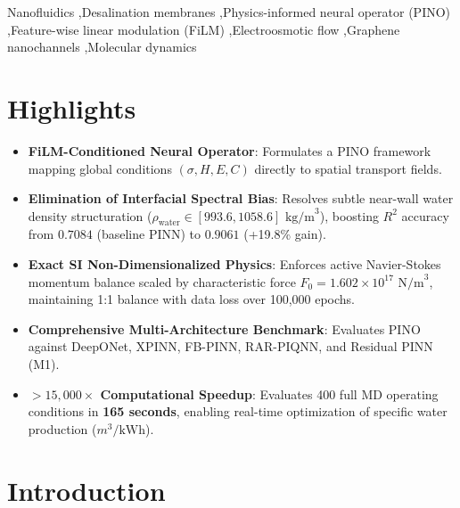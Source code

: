 \documentclass[3p,preprint,12pt,numbers,square,sort&compress]{elsarticle}
\begin{document}
\begin{frontmatter}
\begin{keyword}
Nanofluidics \sep Desalination membranes \sep Physics-informed neural operator (PINO) \sep Feature-wise linear modulation (FiLM) \sep Electroosmotic flow \sep Graphene nanochannels \sep Molecular dynamics
\end{keyword}

\end{frontmatter}

\section*{Highlights}
\begin{itemize}
    \item \textbf{FiLM-Conditioned Neural Operator}: Formulates a PINO framework mapping global conditions $(\sigma, H, E, C)$ directly to spatial transport fields.
    \item \textbf{Elimination of Interfacial Spectral Bias}: Resolves subtle near-wall water density structuration ($\rho_{\text{water}} \in [993.6, 1058.6]\text{ kg/m}^3$), boosting $R^2$ accuracy from $0.7084$ (baseline PINN) to \textbf{$0.9061$} (+19.8\% gain).
    \item \textbf{Exact SI Non-Dimensionalized Physics}: Enforces active Navier-Stokes momentum balance scaled by characteristic force $F_0 = 1.602 \times 10^{17}\text{ N/m}^3$, maintaining 1:1 balance with data loss over 100,000 epochs.
    \item \textbf{Comprehensive Multi-Architecture Benchmark}: Evaluates PINO against DeepONet, XPINN, FB-PINN, RAR-PIQNN, and Residual PINN (M1).
    \item \textbf{$>15,000\times$ Computational Speedup}: Evaluates 400 full MD operating conditions in \textbf{165 seconds}, enabling real-time optimization of specific water production ($m^3/\text{kWh}$).
\end{itemize}

\section{Introduction}
\end{document}
